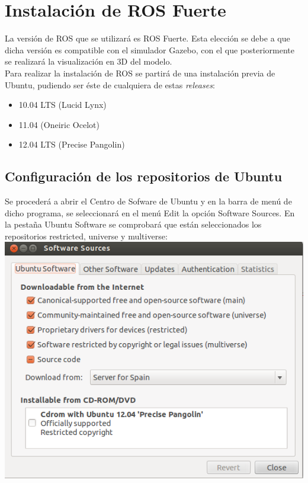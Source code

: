 \documentclass[10pt,a4paper]{report}
\begin{document}
\section{Instalación de ROS Fuerte}

La versión de ROS que se utilizará es ROS Fuerte. Esta elección se debe a que dicha versión es compatible con el simulador Gazebo, con el que posteriormente se realizará la visualización en 3D del modelo.\\

Para realizar la instalación de ROS  se partirá de una instalación previa de Ubuntu, pudiendo ser éste de cualquiera de estas \textit{releases}:

\begin{itemize}
\item 10.04 LTS (Lucid Lynx)
\item 11.04 (Oneiric Ocelot)
\item 12.04 LTS (Precise Pangolin)
\end{itemize}

\subsection{Configuración de los repositorios de Ubuntu}

Se procederá a abrir el Centro de Sofware de Ubuntu y en la barra de menú de dicho programa, se seleccionará en el menú Edit la opción Software Sources. En la pestaña Ubuntu Software se comprobará que están seleccionados los repositorios restricted, universe y multiverse:\\

\includegraphics[scale=0.5]{img/Software sources.png} 
\end{document}
